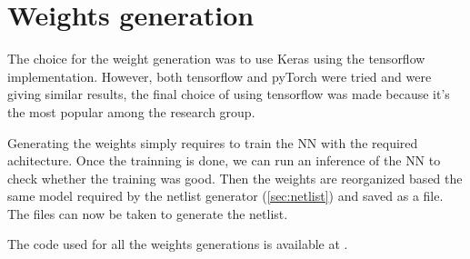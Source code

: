 \section{Weights generation}
\label{sec:weigen}

The choice for the weight generation was to use Keras using the tensorflow implementation. However, both tensorflow and pyTorch were tried and were giving similar results, the final choice of using tensorflow was made because it's the most popular among the research group.

Generating the weights simply requires to train the \ac{NN} with the required achitecture. Once the trainning is done, we can run an inference of the \ac{NN} to check whether the training was good. Then the weights are reorganized based the same model required by the netlist generator (\cref{sec:netlist}) and saved as a file. The files can now be taken to generate the netlist.

The code used for all the weights generations is available at \cite{lstmWei}.
